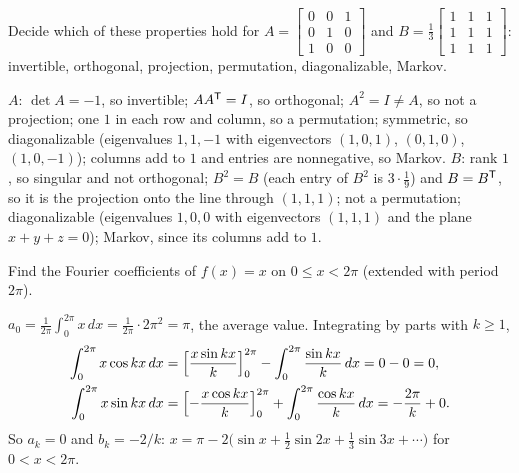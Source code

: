 \begin{exercise}\label{exr:u26-classify}
Decide which of these properties hold for
$A=\left[\begin{smallmatrix} 0&0&1\\ 0&1&0\\ 1&0&0\end{smallmatrix}\right]$ and
$B=\tfrac13\left[\begin{smallmatrix} 1&1&1\\ 1&1&1\\ 1&1&1\end{smallmatrix}\right]$:
invertible, orthogonal, projection, permutation, diagonalizable, Markov.
\end{exercise}
\begin{solution}
$A$: $\det A=-1$, so invertible; $AA^{\mathsf{T}}=I$, so orthogonal; $A^{2}=I\neq A$, so not a
projection; one $1$ in each row and column, so a permutation; symmetric, so diagonalizable
(eigenvalues $1,1,-1$ with eigenvectors $(1,0,1)$, $(0,1,0)$, $(1,0,-1)$); columns add to $1$
and entries are nonnegative, so Markov.
$B$: rank $1$, so singular and not orthogonal; $B^{2}=B$ (each entry of $B^{2}$ is
$3\cdot\tfrac19$) and $B=B^{\mathsf{T}}$, so it is the projection onto the line through $(1,1,1)$; not a
permutation; diagonalizable (eigenvalues $1,0,0$ with eigenvectors $(1,1,1)$ and the plane
$x+y+z=0$); Markov, since its columns add to $1$.
\end{solution}

\begin{exercise}\label{exr:u26-ramp}
Find the Fourier coefficients of $f(x)=x$ on $0\le x<2\pi$ (extended with period $2\pi$).
\end{exercise}
\begin{solution}
$a_0=\frac1{2\pi}\int_0^{2\pi}x\,dx=\frac{1}{2\pi}\cdot2\pi^{2}=\pi$, the average value.
Integrating by parts with $k\ge1$,
\begin{align*}
  \int_0^{2\pi}x\cos kx\,dx&=\Bigl[\frac{x\sin kx}{k}\Bigr]_0^{2\pi}-\int_0^{2\pi}\frac{\sin kx}{k}\,dx=0-0=0,\\
  \int_0^{2\pi}x\sin kx\,dx&=\Bigl[-\frac{x\cos kx}{k}\Bigr]_0^{2\pi}+\int_0^{2\pi}\frac{\cos kx}{k}\,dx=-\frac{2\pi}{k}+0.
\end{align*}
So $a_k=0$ and $b_k=-2/k$:
$x=\pi-2\bigl(\sin x+\tfrac12\sin2x+\tfrac13\sin3x+\cdots\bigr)$ for $0<x<2\pi$.
\end{solution}
